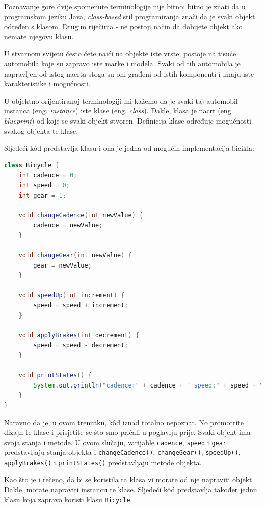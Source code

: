 Poznavanje gore dvije spomenute terminologije nije bitno; bitno je znati da u programskom jeziku Java, \emph{class-based} stil programiranja znači da je svaki objekt određen s klasom. Drugim riječima - ne postoji način da dobijete objekt ako nemate njegovu klasu.

U stvarnom svijetu često ćete naići na objekte iste vrste; postoje na tisuće automobila koje su zapravo iste marke i modela. Svaki od tih automobila je napravljen od istog nacrta stoga su oni građeni od istih komponenti i imaju iste karakteristike i mogućnosti.

U objektno orijentiranoj terminologiji mi kažemo da je svaki taj automobil instanca (eng. \emph{instance}) iste klase (eng. \emph{class}). Dakle, klasa je nacrt (eng. \emph{blueprint}) od koje se svaki objekt stvoren. Definicija klase određuje mogućnosti svakog objekta te klase.

Sljedeći kôd predstavlja klasu i ona je jedna od mogućih implementacija bicikla:~\cite{javatutorials}

\begin{lstlisting}[language=java]
class Bicycle {
    int cadence = 0;
    int speed = 0;
    int gear = 1;
    
    void changeCadence(int newValue) {
        cadence = newValue;
    }
    
    void changeGear(int newValue) {
        gear = newValue;
    }
    
    void speedUp(int increment) {
        speed = speed + increment;
    }
    
    void applyBrakes(int decrement) {
        speed = speed - decrement;
    }
    
    void printStates() {
        System.out.println("cadence:" + cadence + " speed:" + speed + " gear:" + gear);
    }
}
\end{lstlisting}

Naravno da je, u ovom trenutku, kôd iznad totalno nepoznat. No promotrite dizajn te klase i prisjetite se što smo pričali u poglavlju prije. Svaki objekt ima svoja stanja i metode. U ovom slučaju, varijable \texttt{cadence}, \texttt{speed} i \texttt{gear} predstavljaju stanja objekta i \texttt{changeCadence()}, \texttt{changeGear()}, \texttt{speedUp()}, \texttt{applyBrakes()} i \texttt{printStates()} predstavljaju metode objekta.

Kao što je i rečeno, da bi se koristila ta klasa vi morate od nje napraviti objekt. Dakle, morate napraviti instancu te klase. Sljedeći kôd predstavlja također jednu klasu koja zapravo koristi klasu \texttt{Bicycle}.~\cite{javatutorials}

